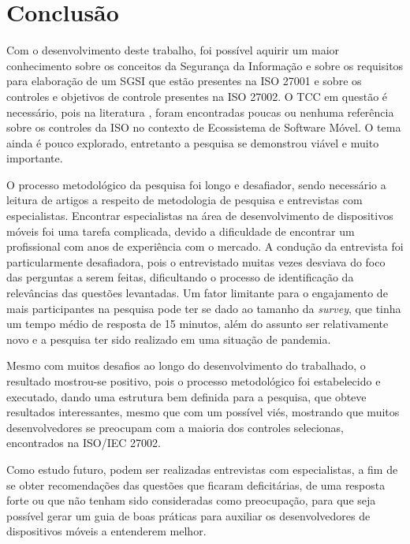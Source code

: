  \chapter{\label{chap:intro}Conclusão}
 



Com o desenvolvimento deste trabalho, foi possível aquirir um maior conhecimento sobre os conceitos da Segurança da Informação e sobre os requisitos para elaboração de um SGSI que estão presentes na ISO 27001 e sobre os controles e objetivos de controle presentes na ISO 27002.  O TCC em questão é necessário, pois na literatura  \cite{caio2019}, foram encontradas poucas ou nenhuma referência sobre os controles da ISO no contexto de Ecossistema de Software Móvel. O tema ainda é pouco explorado, entretanto a pesquisa se demonstrou viável e muito importante.
 
O processo metodológico da pesquisa foi longo e desafiador, sendo necessário a leitura de artigos a respeito de metodologia de pesquisa e entrevistas com especialistas. Encontrar especialistas na área de desenvolvimento de dispositivos móveis foi uma tarefa complicada, devido a dificuldade de encontrar um profissional com anos de experiência com o mercado. A condução da entrevista foi particularmente desafiadora, pois o entrevistado muitas vezes desviava do foco das perguntas a serem feitas, dificultando o processo de identificação da relevâncias das questões levantadas. Um fator limitante para o engajamento de mais participantes na pesquisa pode ter se dado ao tamanho da \textit{survey}, que tinha um tempo médio de resposta de 15 minutos, além do assunto ser relativamente novo e a pesquisa ter sido realizado em uma situação de pandemia. 

Mesmo com muitos desafios ao longo do desenvolvimento do trabalhado, o resultado mostrou-se positivo, pois o processo metodológico foi estabelecido e executado, dando uma estrutura bem definida para a pesquisa, que obteve resultados interessantes, mesmo que com um possível viés, mostrando que muitos desenvolvedores se preocupam com a maioria dos controles selecionas, encontrados na ISO/IEC 27002.
 
 
Como estudo futuro, podem ser realizadas entrevistas com especialistas, a fim de se obter recomendações das questões que ficaram deficitárias, de uma resposta forte ou que não tenham sido consideradas como preocupação, para que seja possível gerar um guia de boas práticas para auxiliar os desenvolvedores de dispositivos móveis a entenderem melhor.
 




